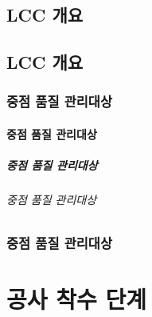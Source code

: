 \documentclass[12pt,a4paper,oneside]{book}
\begin{document}
		\newpage
		\minitoc				%

\newpage  \null
\section{LCC 개요}


\newpage
\section{LCC 개요}

	\subsection{중점 품질 관리대상}

		\subsubsection{중점 품질 관리대상}

		\paragraph{중점 품질 관리대상}

		\subparagraph{중점 품질 관리대상}

				
		\newpage   \null
		\subsection{중점 품질 관리대상}
		
		\newpage
	\newpage
	\paragraph{\large }
		
\newpage  \null
\chapter{공사 착수 단계}
\null
\end{document}
